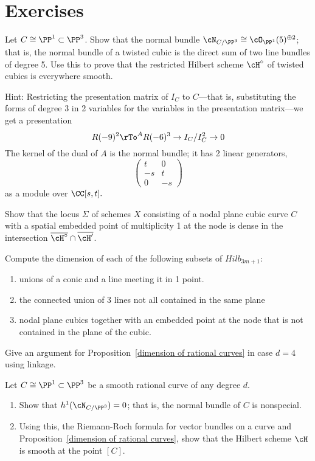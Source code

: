 \section{Exercises}
\begin{exercise}\label{twisted cubic normal bundle}
Let $C \cong \PP^1 \subset \PP^3$. Show that the normal bundle $\cN_{C/\PP^3} \cong \cO_{\PP^1}(5)^{\oplus 2}$; that is, the normal bundle of a twisted cubic is the direct sum of two line bundles of degree 5. Use this to prove that the restricted Hilbert scheme $\cH^\circ$ of twisted cubics is everywhere smooth. \end{exercise}

Hint: Restricting the presentation matrix of $I_C$ to $C$---that is, substituting the forms of degree 3 in 2 variables for the variables in the presentation matrix---we get a presentation 
$$
R(-9)^2 \rTo^A R(-6)^3 \to I_C/I_C^2 \to 0 
$$
The kernel of the dual of $A$ is the normal bundle; it has 2 linear generators, 
$$
\begin{pmatrix}
t&0\\
-s&t\\
0&-s
\end{pmatrix}
$$
as a module over $\CC[s,t].$


\begin{exercise}\label{hilb intersection}
Show that the locus $\Sigma$ of schemes $X$ consisting of a nodal plane cubic curve $C$ with a spatial embedded point of multiplicity 1 at the node is dense in the intersection $\overline{\cH^\circ} \cap \overline{\cH'}$.
\end{exercise}

\begin{exercise}
 Compute the dimension of each of the following subsets of $Hilb_{3m+1}$:
 
\begin{enumerate}
 \item unions of a conic and a line meeting it in 1 point.
 \item the connected union of 3 lines not all contained in the same plane
 \item nodal plane cubics together with an embedded point at the node that is not contained in the plane of
 the cubic.
\end{enumerate}
\end{exercise}

\begin{exercise}
Give an argument for Proposition~\ref{dimension of rational curves} in case $d=4$ using linkage. 
\end{exercise}
\begin{exercise}
Let $C \cong \PP^1 \subset \PP^3$ be a smooth rational curve of any degree $d$. 
\begin{enumerate}
\item Show that $h^1(\cN_{C/\PP^3}) = 0$; that is, the normal bundle of $C$ is nonspecial.
\item Using this, the Riemann-Roch formula for vector bundles on a curve and Proposition~\ref{dimension of rational curves}, show that the Hilbert scheme $\cH$ is smooth at the point $[C]$.
\end{enumerate} 
\end{exercise}

